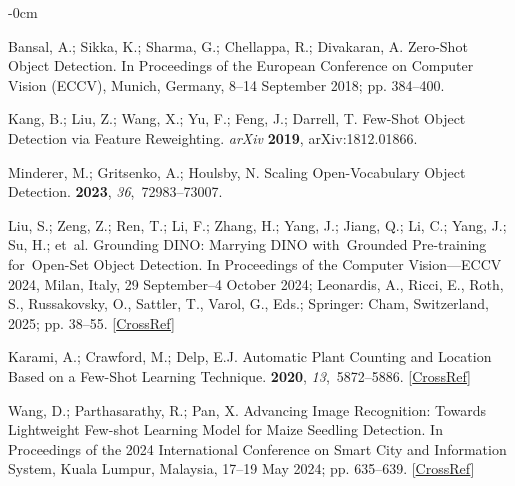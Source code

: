 \documentclass[12pt,a4paper,oneside]{report}
\newlength{\extralength}
\begin{document}
\begin{adjustwidth}{-\extralength}{0cm}
\begin{thebibliography}{999}
Bansal, A.; Sikka, K.; Sharma, G.; Chellappa, R.; Divakaran, A.
\newblock Zero-{{Shot Object Detection}}.
\newblock In Proceedings of the European Conference on Computer Vision (ECCV), Munich, Germany, 8--14 September 2018; pp. 384--400. 

Kang, B.; Liu, Z.; Wang, X.; Yu, F.; Feng, J.; Darrell, T.
\newblock Few-Shot {{Object Detection}} via {{Feature Reweighting}}. {\em arXiv} {\bf2019}, arXiv:1812.01866. 

Minderer, M.; Gritsenko, A.; Houlsby, N.
\newblock Scaling {{Open-Vocabulary Object Detection}}.
 {\bf 2023},
{\em 36},~72983--73007.

Liu, S.; Zeng, Z.; Ren, T.; Li, F.; Zhang, H.; Yang, J.; Jiang, Q.; Li, C.;
Yang, J.; Su, H.;  et~al.
\newblock Grounding {{DINO}}: {{Marrying DINO}} with~{{Grounded Pre-training}}
for~{{Open-Set Object Detection}}.
\newblock In Proceedings of the Computer {{Vision}}---{{ECCV}} 2024, Milan, Italy, 29 September--4 October 2024; Leonardis, A., Ricci, E., Roth, S., Russakovsky, O., Sattler, T., Varol, G., Eds.; Springer: Cham, Switzerland, 
2025; pp. 38--55. [\href{http://dx.doi.org/10.1007/978-3-031-72970-6_3}{CrossRef}]

Karami, A.; Crawford, M.; Delp, E.J.
\newblock Automatic {{Plant Counting}} and {{Location Based}} on a {{Few-Shot
Learning Technique}}.
 {\bf 2020}, {\em 13},~5872--5886. [\href{http://dx.doi.org/10.1109/JSTARS.2020.3025790}{CrossRef}]

Wang, D.; Parthasarathy, R.; Pan, X.
\newblock Advancing {{Image Recognition}}: {{Towards Lightweight Few-shot
Learning Model}} for {{Maize Seedling Detection}}.
\newblock In Proceedings of the 2024 {{International Conference}} on {{Smart City}} and {{Information System}}, Kuala Lumpur, Malaysia, 17--19 May 2024; pp. 635--639. [\href{http://dx.doi.org/10.1145/3685088.3685198}{CrossRef}]


\end{thebibliography}
\end{adjustwidth}
\end{document}
